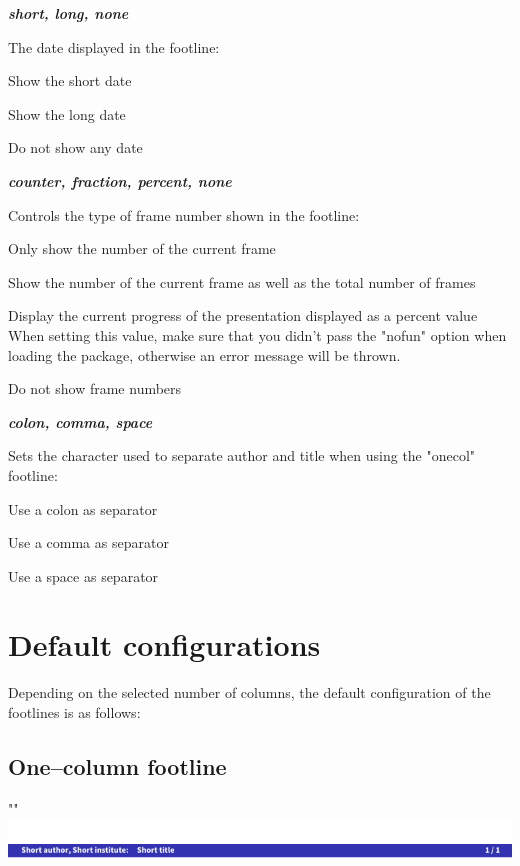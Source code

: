 \documentclass[11pt]{ltxdoc}
\newcommand{\DescribeOption}[3]{
  \DescribeMacro{#1}
  \begin{minipage}[t]{\textwidth}
    \textit{\textbf{#2}}\dotfill~\par
    \begingroup
    \vspace{0.5em}#3\par
    \endgroup
  \end{minipage}%
  \bigskip\medskip%
}
\begin{document}
	\DescribeOption{date}{short, long, none}{%
		The date displayed in the footline:
		\begin{description}\itemsep0pt
			\item[short]
				Show the short date
			\item[long]
				Show the long date
			\item[none]
				Do not show any date
		\end{description}}
	
	\DescribeOption{framenrs}{counter, fraction, percent, none}{%
		Controls the type of frame number shown in the footline:
		\begin{description}\itemsep0pt
			\item[counter]
				Only show the number of the current frame
			\item[fraction]
				Show the number of the current frame as well as the total number of frames
			\item[percent]
				Display the current progress of the presentation displayed as a percent value \\
				When setting this value, make sure that you didn't pass the "nofun" option when loading the package, otherwise an error message will be thrown.
			\item[none]
				Do not show frame numbers
		\end{description}}
	
	\DescribeOption{atsep}{colon, comma, space}{%
		Sets the character used to separate author and title when using the "onecol" footline:
		\begin{description}\itemsep0pt
			\item[colon]
				Use a colon as separator
			\item[comma]
				Use a comma as separator
			\item[space]
				Use a space as separator
		\end{description}}
	
	
	
	\section{Default configurations} \label{defaultconfig}
	Depending on the selected number of columns, the default configuration of the footlines is as follows:
	
	\subsection*{One--column footline}
	"" \\[\smallskipamount]
	\includegraphics[page=1,width=\textwidth, trim=0 0 0 15, clip]{hackthefootline-examples}
	
\end{document}
